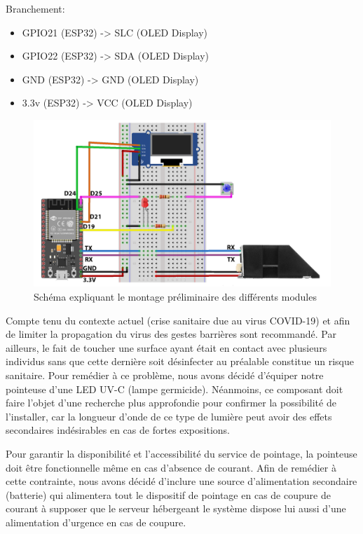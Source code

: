     Branchement: 
    \begin{itemize}
        \item [\textbullet]GPIO21 (ESP32) -> SLC (OLED Display)
        \item [\textbullet]GPIO22 (ESP32) -> SDA (OLED Display)
        \item [\textbullet]GND (ESP32) -> GND (OLED Display) 
        \item [\textbullet]3.3v (ESP32) -> VCC (OLED Display)
    \end{itemize}    
    
    
                \begin{figure}[h!]
                    \centering
                    \includegraphics[scale=0.2]{images/schema/schemat_globale.png}
                    \caption{Schéma expliquant le montage préliminaire des différents modules  }
                    \label{fig54}
                \end{figure}
      Compte tenu du contexte actuel (crise sanitaire due au virus COVID-19) et afin de limiter la propagation du virus des gestes barrières sont recommandé. Par ailleurs, le fait de toucher une surface ayant était en contact avec plusieurs individus sans que cette dernière soit désinfecter au préalable constitue un risque sanitaire. Pour remédier à ce problème, nous avons décidé d’équiper notre pointeuse d’une LED UV-C (lampe germicide). Néanmoins, ce composant doit faire l’objet d’une recherche plus approfondie pour confirmer la possibilité de l’installer, car la longueur d’onde de ce type de lumière peut avoir des effets secondaires indésirables en cas de fortes expositions.

    Pour garantir la disponibilité et l’accessibilité du service de pointage, la pointeuse doit être fonctionnelle même en cas d’absence de courant. Afin de remédier à cette contrainte, nous avons décidé d’inclure une source d’alimentation secondaire (batterie) qui alimentera tout le dispositif de pointage en cas de coupure de courant à supposer que le serveur hébergeant le système dispose lui aussi d’une alimentation d’urgence en cas de coupure.    
   
